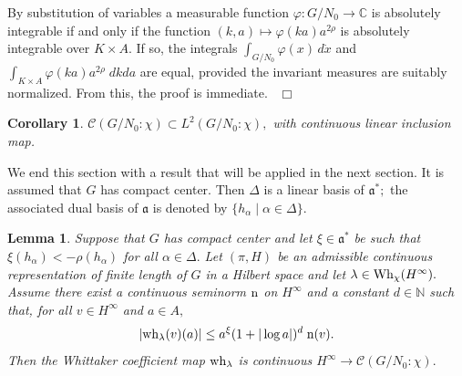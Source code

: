 \documentclass[12pt,a4paper]{article}
\newtheorem{Cor}[Thm]{Corollary}
\newtheorem{Lemma}[Thm]{Lemma}
\newenvironment{cor}[0]{\begin{Cor}\noindent}%
{\end{Cor}}
\newenvironment{lemma}[0]{\begin{Lemma}\noindent}%
{\end{Lemma}}
\def\proof{\par\noindent{\it Proof.}{\ }{\ }}
\def\qed{~\hfill\hbox{$\Box$}\medbreak}
\def\msy#1{{\mathbb #1}}
\def\C{{\msy C}}
\def\N{{\msy N}}
\def\ga{\alpha}
\def\gf{\varphi}
\def\gl{\lambda}
\def\gD{\Delta}
\def\got#1{\mathfrak #1}
\def\fa{{\got a}}
\def\to{\rightarrow}
\def\cC{{\mathcal C}}
\numberwithin{Thm}{section}
\numberwithin{equation}{section}
\def\Wh{{\rm Wh}}
\numberwithin{equation}{section}
\def\fad{{\fa^*}}
\def\wh{{\rm wh}}
\def\col{\!:\!}
\def\cchi{\chi}
\begin{document}
\proof By substitution of variables a measurable function $\gf: G/N_0 \to \C$ 
is absolutely integrable if and only if the function $(k, a)\mapsto  \gf(ka) a^{2\rho}$ 
is absolutely integrable over $K \times A.$ If so, the integrals 
$\int_{G/N_0} \gf(x) \, d\dot{x}$ and $\int_{K\times A} \gf(ka) a^{2\rho} \; dk da$ 
are equal, provided the invariant measures are suitably normalized. From this, the proof 
is immediate.
\qed

\begin{cor} $\cC(G/N_0:\chi) \subset L^2(G/N_0:\chi),$ with continuous linear inclusion map.
\end{cor} 

We end this section with a result that will be applied in
the next section.
It is assumed that $G$ has compact center. Then $\gD$ is a linear basis of 
$\fad;$ the associated dual basis of $\fa$ is denoted by $\{h_\ga\mid \ga \in \gD\}.$

\begin{lemma}
\label{l: exp condition for coeff Schwartz}
Suppose that $G$ has compact center and let
$\xi \in \fad$ be such that $\xi(h_\ga ) < -\rho(h_\ga)$ for all $\ga \in \Delta.$ 
Let $(\pi, H)$ be an admissible continuous representation of finite length
of $G$ in a Hilbert space and let $\gl \in \Wh_\cchi(H^\infty).$ Assume there exist
 a continuous
seminorm ${\rm n}$ on $H^\infty$ and a constant $d \in \N$ such that,
for all $v \in H^\infty$ and $a \in A,$ 
$$ 
|\wh_\gl(v)(a) | \leq a^\xi (1 + |\log a|)^d \; {\rm n} (v).
$$%
Then the Whittaker coefficient map $\wh_\gl$ is continuous 
$H^\infty \to \cC(G/N_0\col \cchi).$ 
\end{lemma}
\end{document}
